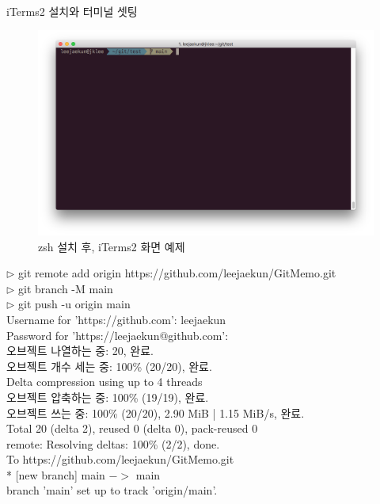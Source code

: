  \newpage
 \noindent \href{https://www.yalco.kr/lectures/git-github/}\textbf{\color{blue}{얄코 강좌}} \\
 iTerms2 설치와 터미널 셋팅 \\
\begin{figure} [!htbp] %
	\centering
	\captionsetup{justification=centering,margin=0.5cm}
	\includegraphics[width=0.7\linewidth]{./fig/zsh-iTerms2.png}
	\caption{zsh 설치 후, iTerms2 화면 예제}
	\label{fig:iTerms2}
\end{figure} 
%
$\rhd$  git remote add origin https://github.com/leejaekun/GitMemo.git \\
$\rhd$ git branch -M main \\
$\rhd$  git push -u origin main \\
Username for 'https://github.com': leejaekun\\
Password for 'https://leejaekun@github.com':\\
오브젝트 나열하는 중: 20, 완료.\\
오브젝트 개수 세는 중: 100\% (20/20), 완료.\\
Delta compression using up to 4 threads\\
오브젝트 압축하는 중: 100\% (19/19), 완료.\\
오브젝트 쓰는 중: 100\% (20/20), 2.90 MiB | 1.15 MiB/s, 완료.\\
Total 20 (delta 2), reused 0 (delta 0), pack-reused 0\\
remote: Resolving deltas: 100\% (2/2), done.\\
To https://github.com/leejaekun/GitMemo.git\\
 * [new branch]      main $->$ main\\
branch 'main' set up to track 'origin/main'.\\
\\



 
 
 
